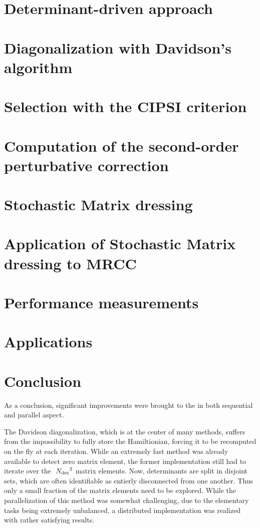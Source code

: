 \documentclass[12pt,a4paper]{report}
\begin{document}
\chapter{Determinant-driven approach}
\minitoc


\chapter{Diagonalization with Davidson's algorithm}
\minitoc


\chapter{Selection with the CIPSI criterion}
\minitoc


\chapter{Computation of the second-order perturbative correction}
\minitoc


\chapter{Stochastic Matrix dressing}
\minitoc


\chapter{Application of Stochastic Matrix dressing to MRCC}
\minitoc


\chapter{Performance measurements}
\minitoc


\chapter{Applications}
\minitoc


\chapter{Conclusion}

As a conclusion, significant improvements were brought to the \QP in both sequential and parallel aspect.

The Davidson diagonalization, which is at the center of many methods, suffers from the impossibility to fully store the Hamiltionian, forcing it to be recomputed on the fly at each iteration. While an extremely fast method was already available to detect zero matrix element,\cite{Scemama_2013} the former implementation still had to iterate over the $~{N_\text{det}}^2$ matrix elements. Now, determinants are split in disjoint sets, which are often identifiable as entierly disconnected from one another. Thus only a small fraction of the matrix elements need to be explored.
While the parallelization of this method was somewhat challenging, due to the elementary tasks being extremely unbalanced, a distributed implementation was realized with rather satisfying results.
\end{document}
